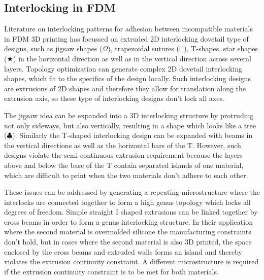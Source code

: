 \subsection{Interlocking in FDM}

Literature on interlocking patterns for adhesion between incompatible materials in FDM 3D printing has focussed on extruded 2D interlocking dovetail type of designs,
such as jigsaw shapes ($\Omega$)\cite{malik2017}, trapezoidal sutures ($\sqcap$)\cite{Li2013}, T-shapes\cite{Ribeiro2019,mustafa2021development}, star shapes ($\bigstar$)\cite{Wang2021} in the horizontal direction
as well as in the vertical direction across several layers\cite{debora2020}.
Topology optimization can generate complex 2D dovetail interlocking shapes, which fit to the specifics of the design locally\cite{aharoni2021}.
Such interlocking designs are extrusions of 2D shapes and therefore they allow for translation along the extrusion axis, so these type of interlocking designs don't lock all axes.

The jigsaw idea can be expanded into a 3D interlocking structure by protruding not only sideways, but also vertically, resulting in a shape which looks like a tree ($\clubsuit$)\cite{gouker2006manufacturing}.
Similarly the T-shaped interlocking design can be expanded with beams in the vertical directions as well as the horizontal bars of the T.
However, such designs violate the semi-continuous extrusion requirement because the layers above and below the base of the T contain separated islands of one material, 
which are difficult to print when the two materials don't adhere to each other.

These issues can be addressed by generating a repeating microstructure where the interlocks are connected together to form a high genus topology which locks all degrees of freedom.
Simple straight I shaped extrusions can be linked together by cross beams in order to form a genus interlocking structure\cite{Rossing2020}.
In their application where the second material is overmolded silicone the manufacturing constraints don't hold,
but in cases where the second material is also 3D printed, the space enclosed by the cross beams and extruded walls forms an island and thereby violates the extrusion continuity constraint.
A different microstructure is required if the extrusion continuity constraint is to be met for both materials.



